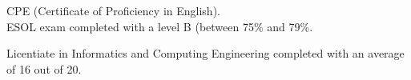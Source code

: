 \documentclass[a4paper,10pt]{memoir} %
\begin{document}
\Sep %






{CPE (Certificate of Proficiency in English).\\
ESOL exam completed with a level B (between 75\% and 79\%.}


{Licentiate in Informatics and Computing Engineering completed with an average of 16 out of 20.}


\Sep %






\end{document}
